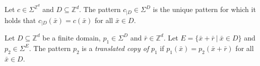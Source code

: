 \documentclass[runningheads]{llncs}
\newcommand{\Z}{\mathbb{Z}}
\newcommand{\set}[2]{\{ #1 \: | \: #2 \}}
\newcommand{\confspace}{\Sigma^{\Z^d}}
\begin{document}
\begin{notation}
Let $c \in \Sigma^{\Z^d}$ and $D \subseteq \Z^d$. The  pattern $c_{|D}\in \Sigma^D$ is the unique pattern for which it holds that $c_{|D}(\bar x) = c(\bar x)$ for all $\bar x \in D$.
\end{notation}



\begin{definition} \label{def_copy}
Let $D \subseteq \Z^d$ be a finite domain, $p_1 \in \Sigma^D$ and $\bar r \in \Z^d$. Let $E = \set{\bar x + \bar r}{\bar x \in D}$
and $p_2 \in \Sigma^{E}$. The pattern $p_2$ is a \emph{translated copy of} $p_1$ if 
$p_1(\bar x) = p_2 (\bar x + \bar r)$
for all $\bar x \in D$.
\end{definition}



%
%
%
%
%
\end{document}

